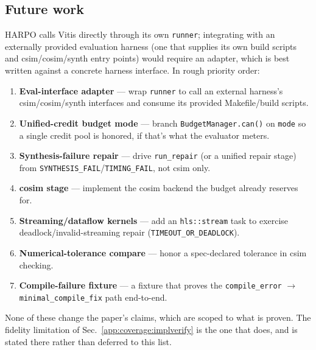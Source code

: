 \subsection{Future work}\label{app:coverage:future}

HARPO calls Vitis directly through its own \texttt{runner}; integrating with an
externally provided evaluation harness (one that supplies its own build scripts and
csim/cosim/synth entry points) would require an adapter, which is best written
against a concrete harness interface. In rough priority order:

\begin{enumerate}
  \item \textbf{Eval-interface adapter} --- wrap \texttt{runner} to call an external
    harness's csim/cosim/synth interfaces and consume its provided Makefile/build
    scripts.
  \item \textbf{Unified-credit budget mode} --- branch \texttt{BudgetManager.can()} on
    \texttt{mode} so a single credit pool is honored, if that's what the evaluator meters.
  \item \textbf{Synthesis-failure repair} --- drive \texttt{run\_repair} (or a unified
    repair stage) from \texttt{SYNTHESIS\_FAIL}/\texttt{TIMING\_FAIL}, not csim only.
  \item \textbf{cosim stage} --- implement the cosim backend the budget already reserves for.
  \item \textbf{Streaming/dataflow kernels} --- add an \texttt{hls::stream} task to
    exercise deadlock/invalid-streaming repair (\texttt{TIMEOUT\_OR\_DEADLOCK}).
  \item \textbf{Numerical-tolerance compare} --- honor a spec-declared tolerance in csim
    checking.
  \item \textbf{Compile-failure fixture} --- a fixture that proves the
    \texttt{compile\_error} $\rightarrow$ \texttt{minimal\_compile\_fix} path end-to-end.
\end{enumerate}

None of these change the paper's claims, which are scoped to what is proven. The
fidelity limitation of Sec.~\ref{app:coverage:implverify} is the one that does, and is
stated there rather than deferred to this list.

